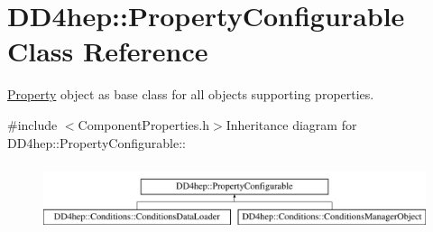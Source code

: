 \hypertarget{class_d_d4hep_1_1_property_configurable}{
\section{DD4hep::PropertyConfigurable Class Reference}
\label{class_d_d4hep_1_1_property_configurable}
}


\hyperlink{class_d_d4hep_1_1_property}{Property} object as base class for all objects supporting properties.  


{\ttfamily \#include $<$ComponentProperties.h$>$}Inheritance diagram for DD4hep::PropertyConfigurable::\begin{figure}[H]
\begin{center}
\leavevmode
\includegraphics[height=1.97183cm]{class_d_d4hep_1_1_property_configurable}
\end{center}
\end{figure}
